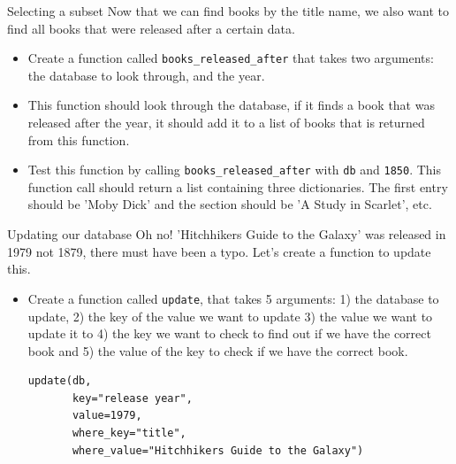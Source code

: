 \documentclass[10pt]{beamer}
\begin{document}
\begin{frame}[label={sec:org9253ae7},fragile]{Selecting a subset}
 Now that we can find books by the title name, we also want to find all books that
were released after a certain data.

\begin{itemize}
\item Create a function called \texttt{books\_released\_after} that takes two arguments: the
database to look through, and the year.
\item This function should look through the database, if it finds a book that was
released after the year, it should add it to a list of books that is returned from
this function.
\item Test this function by calling \texttt{books\_released\_after} with \texttt{db} and \texttt{1850}. This function
call should return a list containing three dictionaries. The first entry should be
'Moby Dick' and the section should be 'A Study in Scarlet', etc.
\end{itemize}
\end{frame}

\begin{frame}[label={sec:org08faca4},fragile]{Updating our database}
 Oh no! 'Hitchhikers Guide to the Galaxy' was released in 1979 not 1879, there must
have been a typo. Let's create a function to update this.

\begin{itemize}
\item Create a function called \texttt{update}, that takes 5 arguments: 1) the database to
update, 2) the key of the value we want to update 3) the value we want to update it
to 4) the key we want to check to find out if we have the correct book and 5) the
value of the key to check if we have the correct book.

\begin{verbatim}
update(db,
       key="release year",
       value=1979,
       where_key="title",
       where_value="Hitchhikers Guide to the Galaxy")
\end{verbatim}
\end{itemize}
\end{frame}
\end{document}
